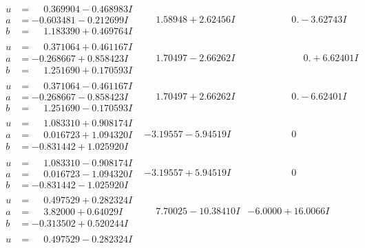 \documentclass[1p]{elsarticle_modified}
\theoremstyle{definition}
\begin{document}
$$\begin{array}{c|c|c}
 \hline 
\begin{aligned}
u &= \phantom{-}0.369904 - 0.468983 I \\
a &= -0.603481 - 0.212699 I \\
b &= \phantom{-}1.183390 + 0.469764 I\end{aligned}
 & \phantom{-}1.58948 + 2.62456 I & \phantom{-0.000000 } 0. - 3.62743 I \\ \hline\begin{aligned}
u &= \phantom{-}0.371064 + 0.461167 I \\
a &= -0.268667 + 0.858423 I \\
b &= \phantom{-}1.251690 + 0.170593 I\end{aligned}
 & \phantom{-}1.70497 - 2.66262 I & \phantom{-0.000000 -}0. + 6.62401 I \\ \hline\begin{aligned}
u &= \phantom{-}0.371064 - 0.461167 I \\
a &= -0.268667 - 0.858423 I \\
b &= \phantom{-}1.251690 - 0.170593 I\end{aligned}
 & \phantom{-}1.70497 + 2.66262 I & \phantom{-0.000000 } 0. - 6.62401 I \\ \hline\begin{aligned}
u &= \phantom{-}1.083310 + 0.908174 I \\
a &= \phantom{-}0.016723 + 1.094320 I \\
b &= -0.831442 + 1.025920 I\end{aligned}
 & -3.19557 - 5.94519 I & \phantom{-0.000000 } 0 \\ \hline\begin{aligned}
u &= \phantom{-}1.083310 - 0.908174 I \\
a &= \phantom{-}0.016723 - 1.094320 I \\
b &= -0.831442 - 1.025920 I\end{aligned}
 & -3.19557 + 5.94519 I & \phantom{-0.000000 } 0 \\ \hline\begin{aligned}
u &= \phantom{-}0.497529 + 0.282324 I \\
a &= \phantom{-}3.82000 + 0.64029 I \\
b &= -0.313502 + 0.520244 I\end{aligned}
 & \phantom{-}7.70025 - 10.38410 I & -6.0000 + 16.0066 I \\ \hline\begin{aligned}
u &= \phantom{-}0.497529 - 0.282324 I \\

\end{aligned}
\end{array}$$
\end{document}
